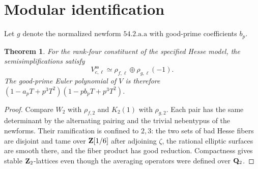 \documentclass[11pt,letterpaper]{article}
\newtheorem{theorem}{Theorem}[section]
\theoremstyle{definition}
\theoremstyle{remark}
\begin{document}
\section{Modular identification}\label{IV:app:modular}
Let $g$ denote the normalized newform $54.2.\mathrm{a}.\mathrm{a}$ with good-prime coefficients $b_p$.
\begin{theorem}\label{IV:thm:comparison}
For the rank-four constituent of the specified Hesse model, the
semisimplifications satisfy
\[
 V_{c,\ell}^{\mathrm{ss}}\simeq
 \rho_{f,\ell}\oplus\rho_{g,\ell}(-1).
\]
The good-prime Euler polynomial of $V$ is therefore
$(1-a_pT+p^3T^2)(1-pb_pT+p^3T^2)$.
\end{theorem}
\begin{proof}
Compare $W_2$ with $\rho_{f,2}$ and $K_2(1)$ with $\rho_{g,2}$.
Each pair has the same determinant by the alternating pairing and
the trivial nebentypus of the newforms. Their ramification is confined
to $2,3$: the two sets of bad Hesse fibers are disjoint and tame
over $\mathbf Z[1/6]$ after adjoining $\zeta$, the rational elliptic surfaces
are smooth there, and the fiber product has good reduction.
Compactness gives stable $\mathbf Z_2$-lattices even though the averaging
operators were defined over $\mathbf Q_2$.


\end{proof}
\end{document}
